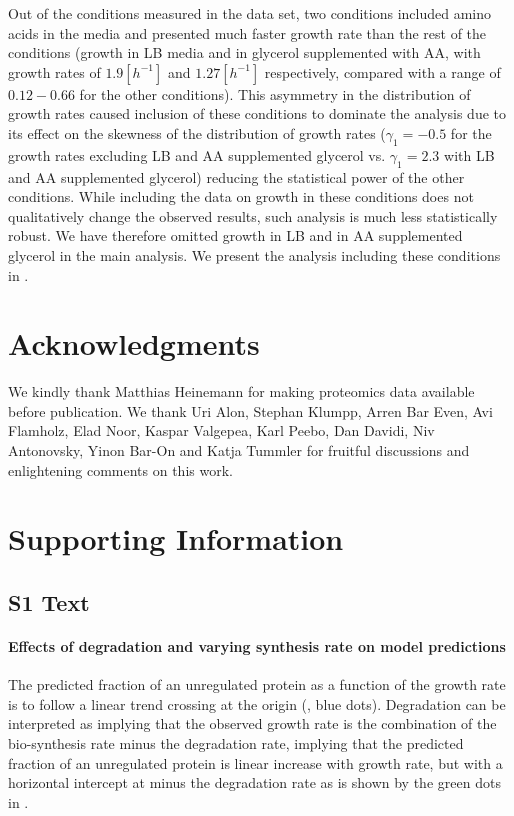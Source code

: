 \documentclass[10pt,letterpaper]{article}
\begin{document}
Out of the conditions measured in the \cite{Schmidt2015} data set, two conditions included amino acids in the media and presented much faster growth rate than the rest of the conditions (growth in LB media and in glycerol supplemented with AA, with growth rates of $1.9[h^{-1}]$ and $1.27[h^{-1}]$ respectively, compared with a range of $0.12-0.66$ for the other conditions).
This asymmetry in the distribution of growth rates caused inclusion of these conditions to dominate the analysis due to its effect on the skewness of the distribution of growth rates ($\gamma_1=-0.5$ for the growth rates excluding LB and AA supplemented glycerol vs. $\gamma_1=2.3$ with LB and AA supplemented glycerol) reducing the statistical power of the other conditions.
While including the data on growth in these conditions does not qualitatively change the observed results, such analysis is much less statistically robust.
We have therefore omitted growth in LB and in AA supplemented glycerol in the main analysis.
We present the analysis including these conditions in .

\section*{Acknowledgments}
We kindly thank Matthias Heinemann for making proteomics data available before publication.
We thank Uri Alon, Stephan Klumpp, Arren Bar Even, Avi Flamholz, Elad Noor, Kaspar Valgepea, Karl Peebo, Dan Davidi, Niv Antonovsky, Yinon Bar-On and Katja Tummler for fruitful discussions and enlightening comments on this work.



\section*{Supporting Information}
\subsection*{S1 Text}
\label{theoreticalintercep}
\paragraph{Effects of degradation and varying synthesis rate on model predictions}
The predicted fraction of an unregulated protein as a function of the growth rate is to follow a linear trend crossing at the origin (, blue dots).
Degradation can be interpreted as implying that the observed growth rate is the combination of the bio-synthesis rate minus the degradation rate, implying that the predicted fraction of an unregulated protein is linear increase with growth rate, but with a horizontal intercept at minus the degradation rate as is shown by the green dots in .
\end{document}
